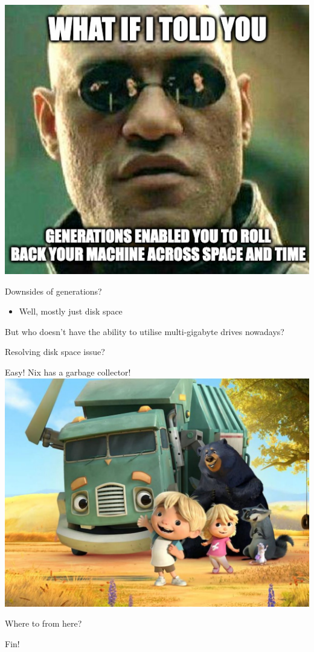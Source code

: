 \documentclass{beamer}
\begin{document}
\begin{frame}
    \centering
    \includegraphics[width=\textheight,keepaspectratio]{../resources/what-if-i-told-you.jpg}
\end{frame}

\begin{frame}
    Downsides of generations?
    \begin{itemize}
        \item Well, mostly just disk space
    \end{itemize}
    But who doesn't have the ability to utilise multi-gigabyte drives nowadays?
\end{frame}

\begin{frame}
    \centering
    Resolving disk space issue?
    \par\vspace{5mm}
    Easy! Nix has a garbage collector!
    \includegraphics[width=\textheight,keepaspectratio]{../resources/trash-truck.jpg}
\end{frame}

\begin{frame}
    \centering
    Where to from here?
\end{frame}

\begin{frame}
    \centering
    Fin!
\end{frame}
\end{document}
